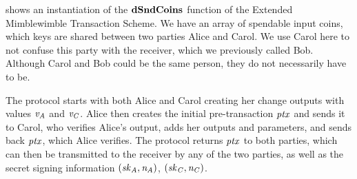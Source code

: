  shows an instantiation of the $\mathbf{dSndCoins}$ function of the Extended Mimblewimble Transaction Scheme.
We have an array of spendable input coins, which keys are shared between two parties Alice and Carol.
We use Carol here to not confuse this party with the receiver, which we previously called Bob.
Although Carol and Bob could be the same person, they do not necessarily have to be.

The protocol starts with both Alice and Carol creating her change outputs with values $\mathit{v}_{\mathit{A}}$ and $\mathit{v}_{\mathit{C}}$.
Alice then creates the initial pre-transaction $\mathit{ptx}$ and sends it to Carol, who verifies Alice's output, adds her outputs and parameters, and sends back $\mathit{ptx}$, which Alice verifies.
The protocol returns $\mathit{ptx}$ to both parties, which can then be transmitted to the receiver by any of the two parties, as well as the secret signing information $(\mathit{sk}_{\mathit{A}}, \mathit{\mathit{n}_{\mathit{A}}})$, $(\mathit{sk}_{\mathit{C}}, \mathit{\mathit{n}_{\mathit{C}}})$.


